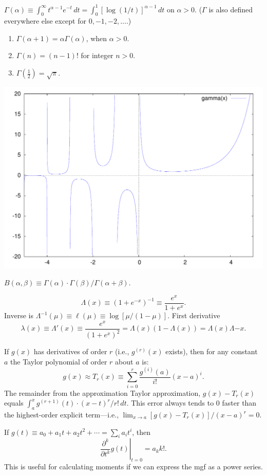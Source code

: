\documentclass[8pt,letterpaper, landscape]{extarticle} %
\renewcommand{\ln}{\log}
\begin{document}
\begin{multicols}{3}
\begin{description}
 $ \Gamma (\alpha) \equiv \int_0^\infty t^{\alpha - 1} e^{-t} \, dt = \int_0^1 [\ln(1/t)]^{\alpha -1} \, dt $ on $ \alpha > 0 $. ($ \Gamma $ is also defined everywhere else except for $ 0, -1, -2, \dotsc $.)
\begin{enumerate}
\item $ \Gamma ( \alpha + 1) = \alpha \Gamma (\alpha) $, when $ \alpha > 0 $.
\item $ \Gamma (n) = (n-1)! $ for integer $ n >0 $.
\item $ \Gamma (\tfrac{1}{2}) = \sqrt{\pi} $.
\end{enumerate}
\begin{center} \includegraphics[width=.5\linewidth]{gamma} \end{center}

 $ B (\alpha, \beta) \equiv \Gamma (\alpha) \cdot \Gamma (\beta) / \Gamma (\alpha + \beta) $.

\[ \Lambda (x) \equiv (1 + e^{-x})^{-1} \equiv \frac{e^x}{1 + e^x}. \]
Inverse is $ \Lambda^{-1}(\mu) \equiv \ell(\mu) \equiv \ln [\mu / (1 - \mu)] $. First derivative
$$ \lambda(x) \equiv \Lambda'(x) \equiv \frac{e^x}{(1 + e^x)^2} = \Lambda(x) (1- \Lambda (x)) = \Lambda(x) \Lambda{-x} . $$

 If $ g(x) $ has derivatives of order $ r $ (i.e., $ g^{(r)}(x) $ exists), then for any constant $ a $ the Taylor polynomial of order $ r $ about $ a $ is:
$$ g(x) \approx T_r (x) \equiv \sum_{i=0}^r \frac{g^{(i)}(a)}{i!}(x-a)^{i}. $$
The remainder from the approximation Taylor approximation, $ g(x) - T_r (x) $ equals $ \int_a^x g^{(r+1)}(t) \cdot (x-t)^r / r! \, dt $.
This error always tends to $ 0 $ faster than the highest-order explicit term---i.e., $ \lim_{x \to a} [g(x) - T_r(x)]/(x-a)^r = 0 $.

 If $ g(t) \equiv  a_0 + a_1 t + a_2 t^2 + \dotsb = \sum_i a_i t^i $, then
$$ \left. \frac{\partial^k}{\partial t^k} g(t) \right|_{t=0} = a_k k!. $$
This is useful for calculating moments if we can express the mgf as a power series.


\end{description}
\end{multicols}
\end{document}
